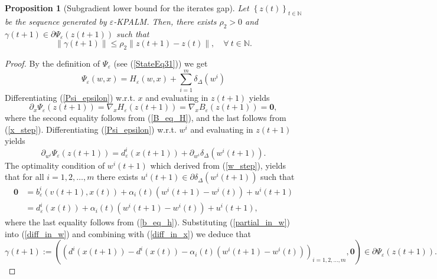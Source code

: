 \documentclass[11pt]{article}
\numberwithin{equation}{section}
\newtheorem{proposition}{Proposition}[section]
\begin{document}
\begin{proposition}[Subgradient lower bound for the iterates gap]
Let $\left\lbrace z(t) \right\rbrace_{t \in \mathbb{N}}$ be the sequence generated by $\varepsilon$-KPALM. Then, there exists $\rho_2 > 0$ and $\gamma(t+1) \in \partial \Psi_{\varepsilon}(z(t+1))$ such that 
\begin{equation*}
	\| \gamma(t+1)\| \leq \rho_2 \|z(t+1) - z(t)\|, \quad \forall \: t \in \mathbb{N} .
\end{equation*}
\end{proposition}

\begin{proof}
By the definition of $\Psi_{\varepsilon}$ (see (\ref{StateEq31})) we get
\begin{equation}
	\Psi_{\varepsilon}(w,x) = H_{\varepsilon}(w,x) + \sum\limits_{i=1}^m \delta_{\Delta}(w^i) \label{Psi_epsilon}
\end{equation}
Differentiating (\ref{Psi_epsilon}) w.r.t. $x$ and evaluating in $z(t+1)$ yields
\begin{equation}
	\partial_x \Psi_{\varepsilon}(z(t+1)) = \nabla_x H_{\varepsilon}(z(t+1)) = \nabla_x B_{\varepsilon}(z(t+1)) = \mathbf{0} , \label{diff_in_x}
\end{equation}
where the second equality follows from (\ref{B_eq_H}), and the last follows from (\ref{x_step}). Differentiating (\ref{Psi_epsilon}) w.r.t. $w^i$ and evaluating in $z(t+1)$ yields
\begin{equation}
	\partial_{w^i} \Psi_{\varepsilon}(z(t+1)) = d^i_{\varepsilon}(x(t+1)) + \partial_{w^i}\delta_{\Delta}(w^i(t+1)) . \label{diff_in_w}
\end{equation}
The optimality condition of $w^i(t+1)$ which derived from (\ref{w_step}), yields that for all $i=1, 2, \ldots ,m$ there exists $u^i(t+1) \in \partial \delta_{\Delta}(w^i(t+1))$ such that
\begin{align}
	\mathbf{0} &= b^i_{\varepsilon}(v(t+1),x(t)) + \alpha_i(t) \left( w^i(t+1) - w^i(t) \right) + u^i(t+1) \\
	&= d^i_{\varepsilon}(x(t)) + \alpha_i(t) \left( w^i(t+1) - w^i(t) \right) + u^i(t+1) , \label{partial_in_w}
\end{align}
where the last equality follows from (\ref{b_eq_h}). Substituting (\ref{partial_in_w}) into (\ref{diff_in_w}) and combining with (\ref{diff_in_x}) we deduce that
\begin{equation*}
	\gamma(t+1) := \left( \left( d^i(x(t+1)) - d^i(x(t)) - \alpha_i(t)(w^i(t+1) - w^i(t)) \right)_{i=1,2, \ldots, m}, \mathbf{0} \right) \in \partial \Psi_{\varepsilon}(z(t+1)).

\end{equation*}
\end{proof}
\end{document}
